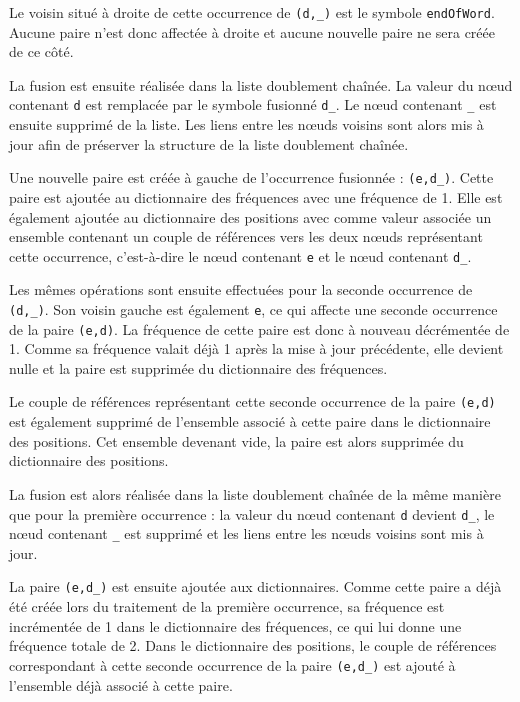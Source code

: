 \documentclass[12pt,a4paper]{report}
\begin{document}
		Le voisin situé à droite de cette occurrence de \texttt{(d,\_)} est le symbole \texttt{endOfWord}. Aucune paire n'est donc affectée à droite et aucune nouvelle paire ne sera créée de ce côté.
		
		La fusion est ensuite réalisée dans la liste doublement chaînée. La valeur du nœud contenant \texttt{d} est remplacée par le symbole fusionné \texttt{d\_}. Le nœud contenant \texttt{\_} est ensuite supprimé de la liste. Les liens entre les nœuds voisins sont alors mis à jour afin de préserver la structure de la liste doublement chaînée.
		
		Une nouvelle paire est créée à gauche de l’occurrence fusionnée : \texttt{(e,d\_)}. Cette paire est ajoutée au dictionnaire des fréquences avec une fréquence de 1. Elle est également ajoutée au dictionnaire des positions avec comme valeur associée un ensemble contenant un couple de références vers les deux nœuds représentant cette occurrence, c’est-à-dire le nœud contenant \texttt{e} et le nœud contenant \texttt{d\_}.
		
		Les mêmes opérations sont ensuite effectuées pour la seconde occurrence de \texttt{(d,\_)}. Son voisin gauche est également \texttt{e}, ce qui affecte une seconde occurrence de la paire \texttt{(e,d)}. La fréquence de cette paire est donc à nouveau décrémentée de 1. Comme sa fréquence valait déjà 1 après la mise à jour précédente, elle devient nulle et la paire est supprimée du dictionnaire des fréquences.
		
		Le couple de références représentant cette seconde occurrence de la paire \texttt{(e,d)} est également supprimé de l’ensemble associé à cette paire dans le dictionnaire des positions. Cet ensemble devenant vide, la paire est alors supprimée du dictionnaire des positions.
		
		La fusion est alors réalisée dans la liste doublement chaînée de la même manière que pour la première occurrence : la valeur du nœud contenant \texttt{d} devient \texttt{d\_}, le nœud contenant \texttt{\_} est supprimé et les liens entre les nœuds voisins sont mis à jour.
		
		La paire \texttt{(e,d\_)} est ensuite ajoutée aux dictionnaires. Comme cette paire a déjà été créée lors du traitement de la première occurrence, sa fréquence est incrémentée de 1 dans le dictionnaire des fréquences, ce qui lui donne une fréquence totale de 2. Dans le dictionnaire des positions, le couple de références correspondant à cette seconde occurrence de la paire \texttt{(e,d\_)} est ajouté à l’ensemble déjà associé à cette paire.
		
\end{document}
